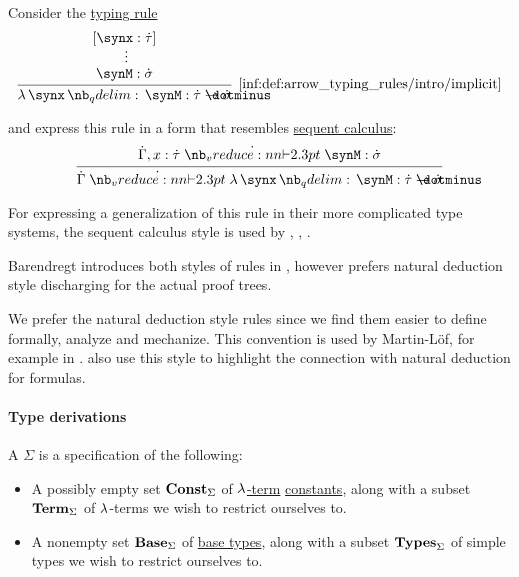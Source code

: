 \begin{remark}\label{rem:typing_rule_style}
  Consider the \hyperref[def:simple_typing_rule]{typing rule}
  \begin{equation*}
    \begin{prooftree}
      \hypo{ [\synx: \syn\tau] }
      \ellipsis {} { \synM: \syn\sigma }
      \infer1[\ref{inf:def:arrow_typing_rules/intro/implicit}]{ \qabs \synx \synM: \syn\tau \synimplies \syn\sigma }
    \end{prooftree}
  \end{equation*}

   and  express this rule in a form that resembles \hyperref[rem:sequent_calculus]{sequent calculus}:
  \begin{equation*}
    \begin{prooftree}
      \hypo{ \syn\Gamma, x: \syn\tau \synvdash \synM: \syn\sigma }
      \infer1{ \syn\Gamma \synvdash \qabs \synx \synM: \syn\tau \synimplies \syn\sigma }
    \end{prooftree}
  \end{equation*}

  For expressing a generalization of this rule in their more complicated type systems, the sequent calculus style is used by , , .

  Barendregt introduces both styles of rules in \cite[def. 3.1.3]{Barendregt1992LambdaCalculiWithTypes}, however prefers natural deduction style discharging for the actual proof trees.

  We prefer the natural deduction style rules since we find them easier to define formally, analyze and mechanize. This convention is used by Martin-L\"of, for example in \cite{MartinLöf1984IntuitionisticTypeTheory}.  also use this style to highlight the connection with natural deduction for formulas.
\end{remark}

\paragraph{Type derivations}

\begin{definition}\label{def:simple_type_signature}\mimprovised
  A  \( \Sigma \) is a specification of the following:
  \begin{itemize}
    \item A possibly empty set \( \op*{Const}_\Sigma \) of \hyperref[def:lambda_term]{\( \mathrm{\lambda} \)-term} \hyperref[def:lambda_term/const]{constants}, along with a subset \( \op*{Term}_\Sigma \) of \( \mathrm{\lambda} \)-terms we wish to restrict ourselves to.

    \item A nonempty set \( \op*{Base}_\Sigma \) of \hyperref[def:simple_type]{base types}, along with a subset \( \op*{Types}_\Sigma \) of simple types we wish to restrict ourselves to.
  \end{itemize}
\end{definition}

